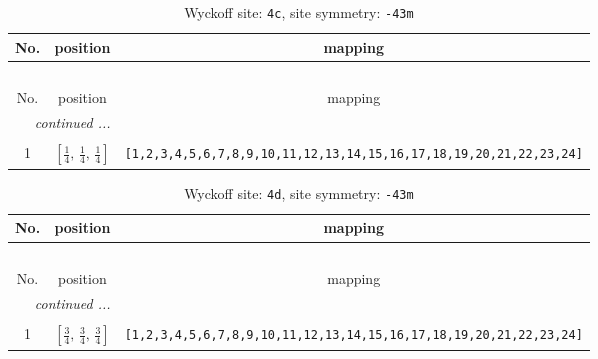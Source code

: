 \documentclass[fleqn,8pt]{jsarticle}
\begin{document}
\renewcommand{\arraystretch}{1.2}
\begin{longtable}{ccc}
\caption{Wyckoff site: {\tt 4c}, site symmetry: {\tt -43m}}
 \\
 \hline \hline
No. & position & mapping \\ \hline \endfirsthead

\multicolumn{2}{l}{\tablename\ \thetable{}} \\
 \hline \hline
No. & position & mapping \\ \hline \endhead

 \hline \hline
\multicolumn{2}{r}{\footnotesize\it continued ...} \\ \endfoot

 \hline \hline
\multicolumn{2}{r}{} \\ \endlastfoot

1 & $\left[ \frac{1}{4},\, \frac{1}{4},\, \frac{1}{4} \right]$ & {\tt [1,2,3,4,5,6,7,8,9,10,11,12,13,14,15,16,17,18,19,20,21,22,23,24]} \\
\end{longtable}
\renewcommand{\arraystretch}{1.2}
\begin{longtable}{ccc}
\caption{Wyckoff site: {\tt 4d}, site symmetry: {\tt -43m}}
 \\
 \hline \hline
No. & position & mapping \\ \hline \endfirsthead

\multicolumn{2}{l}{\tablename\ \thetable{}} \\
 \hline \hline
No. & position & mapping \\ \hline \endhead

 \hline \hline
\multicolumn{2}{r}{\footnotesize\it continued ...} \\ \endfoot

 \hline \hline
\multicolumn{2}{r}{} \\ \endlastfoot

1 & $\left[ \frac{3}{4},\, \frac{3}{4},\, \frac{3}{4} \right]$ & {\tt [1,2,3,4,5,6,7,8,9,10,11,12,13,14,15,16,17,18,19,20,21,22,23,24]} \\
\end{longtable}
\renewcommand{\arraystretch}{1.2}
\end{document}
